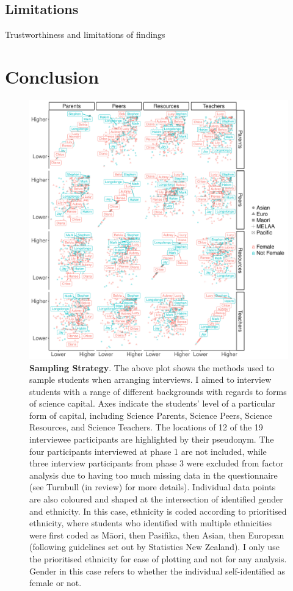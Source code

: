 \documentclass[a4paper,man,natbib]{apa6}
\begin{document}
\subsection{Limitations} Trustworthiness and limitations of findings 


\section{Conclusion}


\begin{figure}
\centering
\includegraphics[width=\textwidth]{ScienceFactors_FacetPlot.pdf}
\caption{\label{fig:ScienceFactors}\textbf{Sampling Strategy}. The above plot shows the methods used to sample students when arranging interviews. I aimed to interview students with a range of different backgrounds with regards to forms of science capital. Axes indicate the students' level of a particular form of capital, including Science Parents, Science Peers, Science Resources, and Science Teachers. The locations of 12 of the 19 interviewee participants are highlighted by their pseudonym. The four participants interviewed at phase 1 are not included, while three interview participants from phase 3 were excluded from factor analysis due to having too much missing data in the questionnaire (see Turnbull (in review) for more details). Individual data points are also coloured and shaped at the intersection of identified gender and ethnicity. In this case, ethnicity is coded according to prioritised ethnicity, where students who identified with multiple ethnicities were first coded as M\={a}ori, then Pasifika, then Asian, then European (following guidelines set out by Statistics New Zealand). I only use the prioritised ethnicity for ease of plotting and not for any analysis. Gender in this case refers to whether the individual self-identified as female or not. }
\end{figure}
\end{document}
